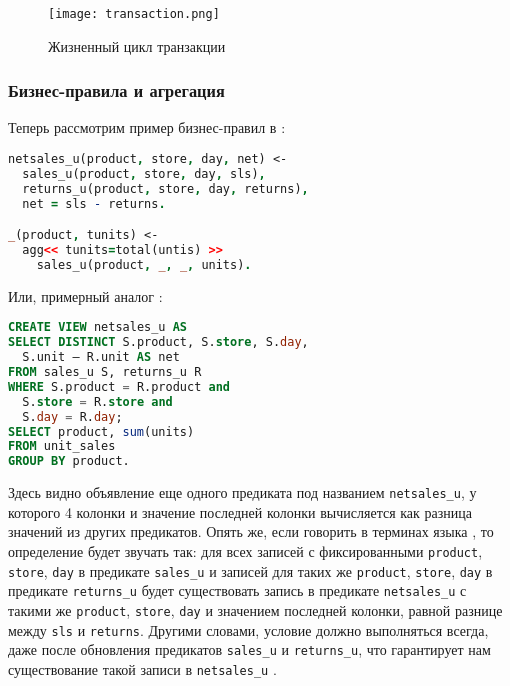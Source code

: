 \begin{figure}
	\centering
	\texttt{[image: transaction.png]}
	\caption{Жизненный цикл транзакции}
	\label{fig:technology:logiql:transaction}
\end{figure}

\subsubsection{Бизнес-правила и агрегация}
\label{sec:technology:logiql:aggregations}

Теперь рассмотрим пример бизнес-правил в \logiql:

\begin{lstlisting}[language=Prolog]
netsales_u(product, store, day, net) <-
  sales_u(product, store, day, sls),
  returns_u(product, store, day, returns),
  net = sls - returns.

_(product, tunits) <-
  agg<< tunits=total(untis) >>
    sales_u(product, _, _, units).
\end{lstlisting}

Или, примерный аналог \sql:

\begin{lstlisting}[language=SQL]
CREATE VIEW netsales_u AS
SELECT DISTINCT S.product, S.store, S.day,
  S.unit – R.unit AS net
FROM sales_u S, returns_u R
WHERE S.product = R.product and
  S.store = R.store and
  S.day = R.day;
SELECT product, sum(units)
FROM unit_sales
GROUP BY product.
\end{lstlisting}

Здесь видно объявление еще одного предиката под названием \lstinline{netsales_u}, у которого 4 колонки и значение последней колонки вычисляется как разница значений из других предикатов. Опять же, если говорить в терминах языка \logiql, то определение будет звучать так: для всех записей с фиксированными \lstinline{product}, \lstinline{store}, \lstinline{day} в предикате \lstinline{sales_u} и записей для таких же \lstinline{product}, \lstinline{store}, \lstinline{day} в предикате \lstinline{returns_u} будет существовать запись в предикате \lstinline{netsales_u} с такими же \lstinline{product}, \lstinline{store}, \lstinline{day} и значением последней колонки, равной разнице между \lstinline{sls} и \lstinline{returns}. Другими словами, условие должно выполняться всегда, даже после обновления предикатов \lstinline{sales_u} и \lstinline{returns_u}, что гарантирует нам существование такой записи в \lstinline{netsales_u} \cite{query_language_for_smart_db}.

